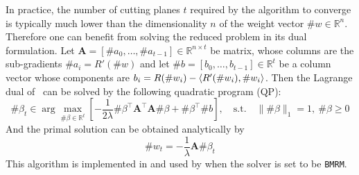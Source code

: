In practice, the number of cutting planes $t$ required by the algorithm to converge is typically much lower than the dimensionality $n$ of the weight vector $\#w \in \mathbb{R}^n$. Therefore one can benefit from solving the reduced problem  in its dual formulation. Let $\mathbf{A} = [\#a_0, \dots, \#a_{t-1}] \in \mathbb{R}^{n \times t}$ be matrix, whose columns are the sub-gradients $\#a_i = R'(\#w)$ and let $\#b = [b_0, \dots, b_{t-1}] \in \mathbb{R}^t$ be a column vector whose components are $b_i = R(\#w_i) - \langle R'(\#w_i), \#w_i \rangle$. Then the Lagrange dual of~ can be solved by the following quadratic program (QP):
%
\begin{equation}
	\#\beta_t \in \arg\max_{\#\beta \in \mathbb{R}^t} \left[ -\frac{1}{2\lambda} \#\beta^\top\mathbf{A}^\top\mathbf{A}\#\beta + \#\beta^\top\#b  \right],\quad \mathrm{s.t.}\quad \| \#\beta \|_1 = 1,\ \#\beta \ge 0
\end{equation}
%
And the primal solution can be obtained analytically by
%
\begin{equation}
	\#w_t = -\frac{1}{\lambda}\mathbf{A}\#\beta_t
\end{equation}
%
This algorithm is implemented in  and used by  when the solver is set to be {\tt BMRM}.
